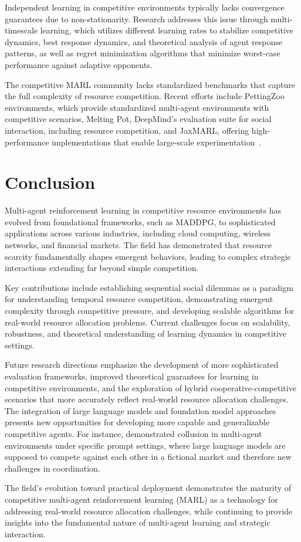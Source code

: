 Independent learning in competitive environments typically lacks convergence guarantees due to non-stationarity. Research addresses this issue through multi-timescale learning, which utilizes different learning rates to stabilize competitive dynamics, best response dynamics, and theoretical analysis of agent response patterns, as well as regret minimization algorithms that minimize worst-case performance against adaptive opponents.

The competitive MARL community lacks standardized benchmarks that capture the full complexity of resource competition. Recent efforts include PettingZoo environments, which provide standardized multi-agent environments with competitive scenarios, Melting Pot, DeepMind's evaluation suite for social interaction, including resource competition, and JaxMARL, offering high-performance implementations that enable large-scale experimentation~\autocite{liu_scaling_2024}.

\section{Conclusion}

Multi-agent reinforcement learning in competitive resource environments has evolved from foundational frameworks, such as MADDPG, to sophisticated applications across various industries, including cloud computing, wireless networks, and financial markets. The field has demonstrated that resource scarcity fundamentally shapes emergent behaviors, leading to complex strategic interactions extending far beyond simple competition.

Key contributions include establishing sequential social dilemmas as a paradigm for understanding temporal resource competition, demonstrating emergent complexity through competitive pressure, and developing scalable algorithms for real-world resource allocation problems. Current challenges focus on scalability, robustness, and theoretical understanding of learning dynamics in competitive settings.

Future research directions emphasize the development of more sophisticated evaluation frameworks, improved theoretical guarantees for learning in competitive environments, and the exploration of hybrid cooperative-competitive scenarios that more accurately reflect real-world resource allocation challenges. The integration of large language models and foundation model approaches presents new opportunities for developing more capable and generalizable competitive agents. For instance, \textcite{fish_algorithmic_2025} demonstrated collusion in multi-agent environments under specific prompt settings, where large language models are supposed to compete against each other in a fictional market and therefore new challenges in coordination. 

The field's evolution toward practical deployment demonstrates the maturity of competitive multi-agent reinforcement learning (MARL) as a technology for addressing real-world resource allocation challenges, while continuing to provide insights into the fundamental nature of multi-agent learning and strategic interaction.